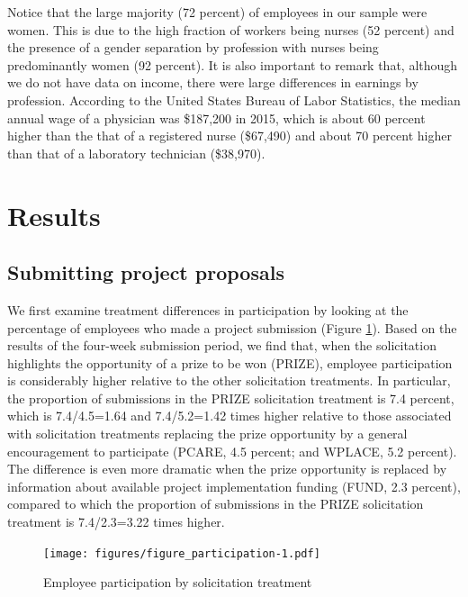 \documentclass[12pt, titlepage]{article}
\begin{document}
Notice that the large majority (72 percent) of employees in our sample
were women. This is due to the high fraction of workers being nurses (52
percent) and the presence of a gender separation by profession with
nurses being predominantly women (92 percent). It is also important to
remark that, although we do not have data on income, there were large
differences in earnings by profession. According to the United States
Bureau of Labor Statistics, the median annual wage of a physician was
\$187,200 in 2015, which is about 60 percent higher than the that of a
registered nurse (\$67,490) and about 70 percent higher than that of a
laboratory technician (\$38,970).

\clearpage

\section{Results}\label{results}

\subsection{Submitting project
proposals}\label{submitting-project-proposals}

We first examine treatment differences in participation by looking at
the percentage of employees who made a project submission (Figure
\ref{figure_participation}). Based on the results of the four-week
submission period, we find that, when the solicitation highlights the
opportunity of a prize to be won (PRIZE), employee participation is
considerably higher relative to the other solicitation treatments. In
particular, the proportion of submissions in the PRIZE solicitation
treatment is 7.4 percent, which is 7.4/4.5=1.64 and 7.4/5.2=1.42 times
higher relative to those associated with solicitation treatments
replacing the prize opportunity by a general encouragement to
participate (PCARE, 4.5 percent; and WPLACE, 5.2 percent). The
difference is even more dramatic when the prize opportunity is replaced
by information about available project implementation funding (FUND, 2.3
percent), compared to which the proportion of submissions in the PRIZE
solicitation treatment is 7.4/2.3=3.22 times higher.

\begin{figure}
\caption{Employee participation by solicitation treatment}
\label{figure_participation}
\centering
\texttt{[image: figures/figure\_participation-1.pdf]}
\end{figure}
\end{document}
